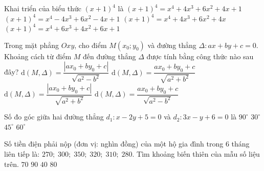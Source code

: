 \begin{ex}%
Khai triển của biểu thức $(x+1)^4$ là
\choice
{\True $(x+1)^4=x^4+4x^3+6x^2+4x+1$}
{$(x+1)^4=x^4-4x^3+6x^2-4x+1$}
{$(x+1)^4=x^4+4x^3+6x^2+4x$}
{$(x+1)^4=x^4+6x^3+4x^2+6x+1$}
\end{ex}

\begin{ex}%
Trong mặt phẳng $Oxy$, cho điểm $ M(x_0;y_0)$ và đường thẳng $\Delta \colon ax+by+c=0$. Khoảng cách từ điểm $M$ đến đường thẳng $\Delta $ được tính bằng công thức nào sau đây?
\choice
{$\mathrm{d}(M,\Delta)=\dfrac{\left| ax_0+by_0+c\right|}{\sqrt{a^2-b^2}}$}
{$\mathrm{d}(M,\Delta)=\dfrac{ax_0+by_0+c}{\sqrt{a^2+b^2}}$}
{\True $\mathrm{d}(M,\Delta)=\dfrac{\left| ax_0+by_0+c\right|}{\sqrt{a^2+b^2}}$}
{$\mathrm{d}(M,\Delta)=\dfrac{ax_0+by_0+c}{\sqrt{a^2-b^2}}$}
\end{ex}

\begin{ex}%
Số đo góc giữa hai đường thẳng $d_1\colon x-2y+5=0$ và $d_2\colon 3x-y+6=0$ là
\choice
{$90^\circ$}
{$30^\circ$}
{\True $45^\circ$}
{$60^\circ$}
\end{ex}

\begin{ex}%
Số tiền điện phải nộp (đơn vị: nghìn đồng) của một hộ gia đình trong 6 tháng liên tiếp là: $ 270; \; 300; \; 350; \; 320; \; 310; \; 280$. Tìm khoảng biến thiên của mẫu số liệu trên.
\choice
{$70$}
{$90$}
{$40$}
{\True $80$}
\end{ex}

